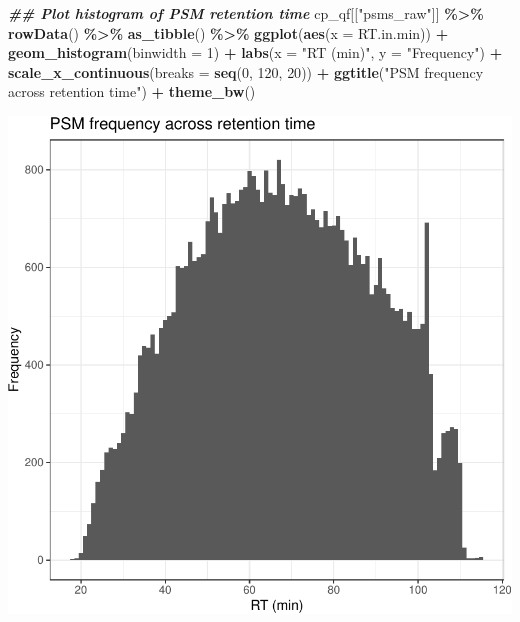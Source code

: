 \documentclass[9pt,a4paper,]{extarticle}
\newenvironment{Shaded}{\begin{snugshade}}{\end{snugshade}}
\newcommand{\AttributeTok}[1]{\textcolor[rgb]{0.13,0.29,0.53}{#1}}
\newcommand{\DecValTok}[1]{\textcolor[rgb]{0.00,0.00,0.81}{#1}}
\newcommand{\DocumentationTok}[1]{\textcolor[rgb]{0.56,0.35,0.01}{\textbf{\textit{#1}}}}
\newcommand{\FunctionTok}[1]{\textcolor[rgb]{0.13,0.29,0.53}{\textbf{#1}}}
\newcommand{\NormalTok}[1]{#1}
\newcommand{\SpecialCharTok}[1]{\textcolor[rgb]{0.81,0.36,0.00}{\textbf{#1}}}
\newcommand{\StringTok}[1]{\textcolor[rgb]{0.31,0.60,0.02}{#1}}
\begin{document}
\begin{Shaded}
\begin{Highlighting}[]
\DocumentationTok{\#\# Plot histogram of PSM retention time}
\NormalTok{cp\_qf[[}\StringTok{"psms\_raw"}\NormalTok{]] }\SpecialCharTok{\%\textgreater{}\%}
  \FunctionTok{rowData}\NormalTok{() }\SpecialCharTok{\%\textgreater{}\%} 
  \FunctionTok{as\_tibble}\NormalTok{() }\SpecialCharTok{\%\textgreater{}\%}
  \FunctionTok{ggplot}\NormalTok{(}\FunctionTok{aes}\NormalTok{(}\AttributeTok{x =}\NormalTok{ RT.in.min)) }\SpecialCharTok{+}
  \FunctionTok{geom\_histogram}\NormalTok{(}\AttributeTok{binwidth =} \DecValTok{1}\NormalTok{) }\SpecialCharTok{+}
  \FunctionTok{labs}\NormalTok{(}\AttributeTok{x =} \StringTok{"RT (min)"}\NormalTok{, }\AttributeTok{y =} \StringTok{"Frequency"}\NormalTok{) }\SpecialCharTok{+}
  \FunctionTok{scale\_x\_continuous}\NormalTok{(}\AttributeTok{breaks =} \FunctionTok{seq}\NormalTok{(}\DecValTok{0}\NormalTok{, }\DecValTok{120}\NormalTok{, }\DecValTok{20}\NormalTok{)) }\SpecialCharTok{+}
  \FunctionTok{ggtitle}\NormalTok{(}\StringTok{"PSM frequency across retention time"}\NormalTok{) }\SpecialCharTok{+}
  \FunctionTok{theme\_bw}\NormalTok{()}
\end{Highlighting}
\end{Shaded}

\begin{center}\includegraphics[height=0.3\textheight]{workflow_expressions_files/figure-latex/tmt_RT-1} \end{center}
\end{document}
